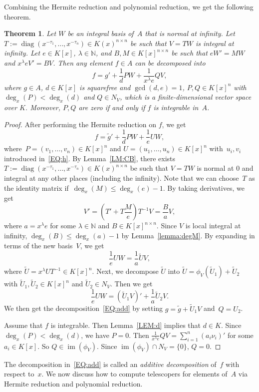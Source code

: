 \documentclass{sig-alternate}
\newtheorem{theorem}{Theorem}
\newcommand{\bN}{ {\mathbb N}}
\def\im{\operatorname{im}}
\def\diag{\operatorname{diag}}
\begin{document}
Combining the Hermite reduction and polynomial reduction, we get the following theorem.
\begin{theorem}\label{THM:polyred}
Let $W$ be an integral basis of~$A$ that is normal at infinity.
Let $T := \diag(x^{-\tau_1}, \ldots, x^{-\tau_n}) \in K(x)^{n\times n}$
be such that $V = TW$ is integral at infinity.
Let $e\in K[x]$, $\lambda \in \bN$, and $B, M \in K[x]^{n \times n} $ be such that
$eW' = MW$ and $x^\lambda eV' = BV$.
Then any element $f\in A$ can be decomposed into
\begin{equation}\label{EQ:add}
f = g' + \frac{1}{d} PW + \frac{1}{x^\lambda e} QV,
\end{equation}
where $g\in A$, $d\in K[x]$ is squarefree and $\gcd(d, e)=1$, $P, Q\in K[x]^n$ with $\deg_x(P) < \deg_x(d)$ and $Q\in N_V$, which is
a finite-dimensional vector space over $K$. Moreover, $P, Q$ are zero if and only if $f$ is integrable in~$A$.
\end{theorem}
\begin{proof}
After performing the Hermite reduction on $f$, we get
\[f = \tilde{g}' + \frac{1}{d} PW + \frac{1}{e} UW,\]
where~$P = (v_1, \ldots, v_n)\in K[x]^n$ and $U = (u_1, \ldots, u_n)\in K[x]^n$
with~$u_i, v_i$ introduced in~\eqref{EQ:h}. By Lemma~\ref{LM:CB}, there exists
$T := \diag(x^{-\tau_1}, \ldots, x^{-\tau_n}) \in K(x)^{n\times n}$
be such that $V = TW$ is normal at $0$ and integral at any other places (including the infinity). Note that we can
choose~$T$ as the identity matrix if~$\deg_x(M)\leq \deg_x(e)-1$.
By taking derivatives, we get
\[V' = \left(T' + T\frac{M}{e}\right)T^{-1}V = \frac{B}{a}V, \]
where $a=x^\lambda e$ for some $\lambda\in \bN$ and $B\in K[x]^{n\times n}$. Since $V$ is local integral
at infinity, $\deg_x(B) \leq \deg_x(a)-1$ by Lemma~\ref{lemma:degM}.
By expanding in terms of the new basis~$V$, we get
\[\frac{1}{e} UW = \frac{1}{a} \tilde{U}V, \]
where $\tilde{U} = x^\lambda U T^{-1} \in K[x]^n$. Next, we decompose $\tilde{U}$ into
$\tilde{U} = \phi_{V}(\tilde{U}_1) + \tilde{U}_2$ with $\tilde{U}_1, \tilde{U}_2\in K[x]^n$ and
$\tilde{U}_2\in N_V$. Then we get
\[\frac{1}{e} UW = (\tilde U_1 V)' + \frac{1}{a} \tilde U_2 V. \]
We then get the decomposition~\eqref{EQ:add} by setting
$g = \tilde g + \tilde U_1 V$ and~$Q = U_2$.

Assume that $f$ is integrable. Then Lemma~\ref{LEM:d} implies that $d\in K$.
Since $\deg_x(P) < \deg_x(d)$, we have $P=0$. Then $\frac{1}{x^\lambda e} QV = \sum_{i=1}^n (a_i \nu_i)'$
for some $a_i\in K[x]$. So $Q \in \im(\phi_V)$.
Since $\im(\phi_V) \cap N_V = \{0\}$, $Q=0$.
\end{proof}
The decomposition in~\eqref{EQ:add} is called an \emph{additive decomposition} of~$f$ with respect to~$x$.
We now discuss how to compute telescopers for elements of~$A$ via Hermite reduction and
polynomial reduction.
\end{document}
